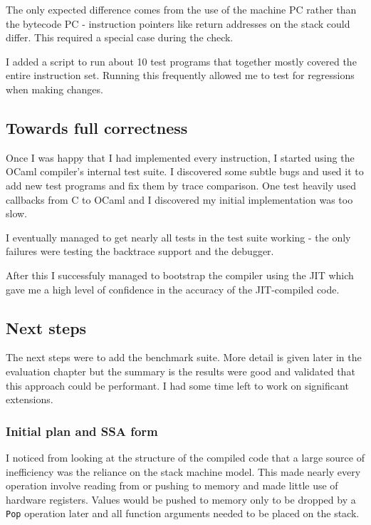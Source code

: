 The only expected difference comes from the use of the machine PC rather than the bytecode PC -
instruction pointers like return addresses on the stack could differ. This required a special case
during the check.

I added a script to run about 10 test programs that together mostly covered the entire instruction
set. Running this frequently allowed me to test for regressions when making changes.

\subsection{Towards full correctness}

Once I was happy that I had implemented every instruction, I started using
the OCaml compiler's internal test suite. I discovered some subtle bugs and used it to add new test
programs and fix them by trace comparison. One test heavily used callbacks from C to OCaml and I
discovered my initial implementation was too slow.

I eventually managed to get nearly all tests in the test suite working - the only failures were
testing the backtrace support and the debugger.

After this I successfuly managed to bootstrap the compiler using the JIT which gave me a high level
of confidence in the accuracy of the JIT-compiled code.

\subsection{Next steps}

The next steps were to add the benchmark suite. More detail is given later in the evaluation
chapter but the summary is the results were good and validated that this approach could be
performant. I had some time left to work on significant extensions.

\subsubsection{Initial plan and SSA form}

I noticed from looking at the structure of the compiled code that a large source of inefficiency
was the reliance on the stack machine model. This made nearly every operation involve reading from
or pushing to memory and made little use of hardware registers. Values would be pushed to memory
only to be dropped by a \texttt{Pop} operation later and all function arguments needed to be placed
on the stack.

